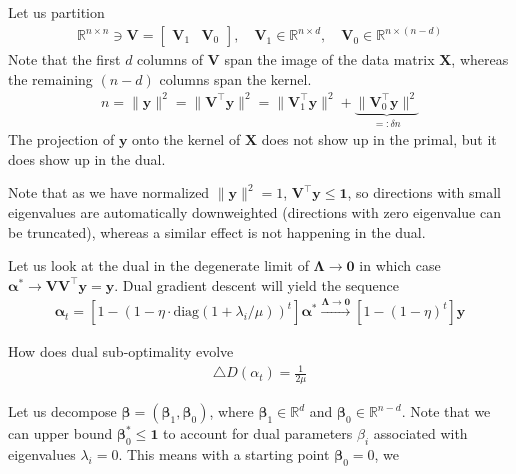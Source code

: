\documentclass{article}
\newcommand{\y}{{\mathbf y}}
\newcommand{\mX}{{\mathbf X}}
\newcommand{\mV}{{\mathbf V}}
\renewcommand{\Re}{{\mathbb R}}
\newcommand{\mLambda}{{\mathbf \Lambda}}
\newcommand{\vAlpha}{{\bm \alpha}}
\newcommand{\vBeta}{{\bm \beta}}
\begin{document}
\newpage

Let us partition 
\begin{align}
\Re^{n \times n} \ni \mV = 
\begin{bmatrix}
\mV_{1} &  \mV_0
\end{bmatrix}, 
\quad \mV_{1} \in \Re^{n \times d}, \quad \mV_0 \in \Re^{n \times (n-d)}
\end{align}
Note that the first $d$ columns of $\mV$ span the image of the data matrix $\mX$, whereas the remaining $(n-d)$ columns span the kernel.
\begin{align}
n = \| \y \|^2 = \| \mV^\top \y \|^2 = \| \mV_1^\top \y\|^2 + \underbrace{\| \mV_0^\top \y \|^2}_{=: \delta n} 
\end{align}
The projection of $\y$ onto the kernel of $\mX$ does not show up in the primal, but it does show up in the dual. 




\newpage

Note that as we have normalized $\| \y\|^2=1$, $\mV^\top \y \le \bm 1$, so directions with small eigenvalues are automatically downweighted (directions with zero eigenvalue can be truncated), whereas a similar effect is not happening in the dual. 



Let us look at the dual in the degenerate limit of $\mLambda \to \bm 0$ in which case $\vAlpha^* \to \mV \mV^\top \y = \y$. Dual gradient descent will yield the sequence 
\begin{align}
\vAlpha_t  = \left[ 1-( 1-\eta \cdot \text{diag}(1+\lambda_i/\mu))^t \right]  \vAlpha^*
\stackrel{\mLambda \to \bm 0}{\longrightarrow}  \left[ 1-( 1-\eta)^t \right]  \y
\end{align}

How does dual sub-optimality evolve 
\begin{align}
\triangle D(\alpha_t) = \frac{1}{2\mu}
\end{align}


\newpage
Let us decompose $\vBeta = (\vBeta_1,\vBeta_0)$, where $\vBeta_1 \in \Re^d$ and $\vBeta_0 \in \Re^{n-d}$. Note that we can upper bound $\vBeta^*_0 \le \bm 1$ to account for dual parameters $\beta_i$ associated with eigenvalues $\lambda_i=0$. This means with a starting point $\vBeta_0 = 0$, we  
\end{document}
